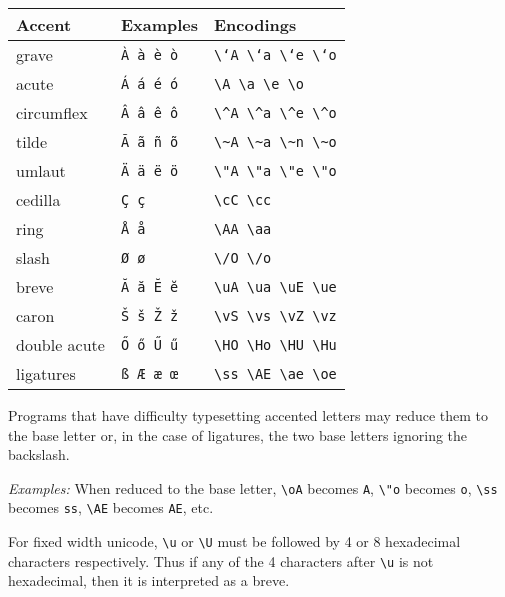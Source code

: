 \begin{longtable}[]{@{}lll@{}}
\toprule
Accent & Examples & Encodings\tabularnewline
\midrule
\endhead
grave & \texttt{À\ à\ è\ ò} &
\texttt{\textbackslash{}`A\ \textbackslash{}`a\ \textbackslash{}`e\ \textbackslash{}`o}\tabularnewline
acute & \texttt{Á\ á\ é\ ó} &
\texttt{\textbackslash{}\textquotesingle{}A\ \textbackslash{}\textquotesingle{}a\ \textbackslash{}\textquotesingle{}e\ \textbackslash{}\textquotesingle{}o}\tabularnewline
circumflex & \texttt{Â\ â\ ê\ ô} &
\texttt{\textbackslash{}\^{}A\ \textbackslash{}\^{}a\ \textbackslash{}\^{}e\ \textbackslash{}\^{}o}\tabularnewline
tilde & \texttt{Ã\ ã\ ñ\ õ} &
\texttt{\textbackslash{}\textasciitilde{}A\ \textbackslash{}\textasciitilde{}a\ \textbackslash{}\textasciitilde{}n\ \textbackslash{}\textasciitilde{}o}\tabularnewline
umlaut & \texttt{Ä\ ä\ ë\ ö} &
\texttt{\textbackslash{}"A\ \textbackslash{}"a\ \textbackslash{}"e\ \textbackslash{}"o}\tabularnewline
cedilla & \texttt{Ç\ ç} &
\texttt{\textbackslash{}cC\ \textbackslash{}cc}\tabularnewline
ring & \texttt{Å\ å} &
\texttt{\textbackslash{}AA\ \textbackslash{}aa}\tabularnewline
slash & \texttt{Ø\ ø} &
\texttt{\textbackslash{}/O\ \textbackslash{}/o}\tabularnewline
breve & \texttt{Ă\ ă\ Ĕ\ ĕ} &
\texttt{\textbackslash{}uA\ \textbackslash{}ua\ \textbackslash{}uE\ \textbackslash{}ue}\tabularnewline
caron & \texttt{Š\ š\ Ž\ ž} &
\texttt{\textbackslash{}vS\ \textbackslash{}vs\ \textbackslash{}vZ\ \textbackslash{}vz}\tabularnewline
double acute & \texttt{Ő\ ő\ Ű\ ű} &
\texttt{\textbackslash{}HO\ \textbackslash{}Ho\ \textbackslash{}HU\ \textbackslash{}Hu}\tabularnewline
ligatures & \texttt{ß\ Æ\ æ\ œ} &
\texttt{\textbackslash{}ss\ \textbackslash{}AE\ \textbackslash{}ae\ \textbackslash{}oe}\tabularnewline
\bottomrule
\end{longtable}

Programs that have difficulty typesetting accented letters may reduce
them to the base letter or, in the case of ligatures, the two base
letters ignoring the backslash.

\emph{Examples:} When reduced to the base letter,
\texttt{\textbackslash{}oA} becomes \texttt{A},
\texttt{\textbackslash{}"o} becomes \texttt{o},
\texttt{\textbackslash{}ss} becomes \texttt{ss},
\texttt{\textbackslash{}AE} becomes \texttt{AE}, etc.

For fixed width unicode, \texttt{\textbackslash{}u} or
\texttt{\textbackslash{}U} must be followed by 4 or 8 hexadecimal
characters respectively. Thus if any of the 4 characters after
\texttt{\textbackslash{}u} is not hexadecimal, then it is interpreted as
a breve.

